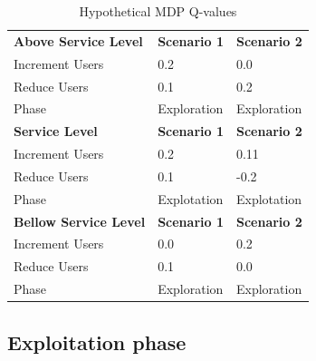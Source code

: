 \documentclass[espaco=umemeio,chapter=TITLE,twoside,openright]{abnt}
\begin{document}
\begin{table}[h]
\centering
\caption{Hypothetical MDP Q-values }
\label{pab:mdp}
\begin{tabular}{lll}
\rowcolor[HTML]{C0C0C0} 
\textbf{Above Service Level}  & \textbf{Scenario 1} & \textbf{Scenario 2} \\
Increment Users               & 0.2                 & 0.0                 \\
Reduce Users                  & 0.1                 & 0.2                 \\
Phase                         & Exploration         & Exploration         \\
\rowcolor[HTML]{C0C0C0} 
\textbf{Service Level}        & \textbf{Scenario 1} & \textbf{Scenario 2} \\
Increment Users               & 0.2                 & 0.11                \\
Reduce Users                  & 0.1                 & -0.2                \\
\rowcolor[HTML]{F8FF00} 
Phase                         & Explotation         & Explotation         \\
\rowcolor[HTML]{C0C0C0} 
\textbf{Bellow Service Level} & \textbf{Scenario 1} & \textbf{Scenario 2} \\
Increment Users               & 0.0                 & 0.2                 \\
Reduce Users                  & 0.1                 & 0.0                 \\
Phase                         & Exploration         & Exploration        
\end{tabular}
\end{table}

\subsection{Exploitation phase}
\end{document}
